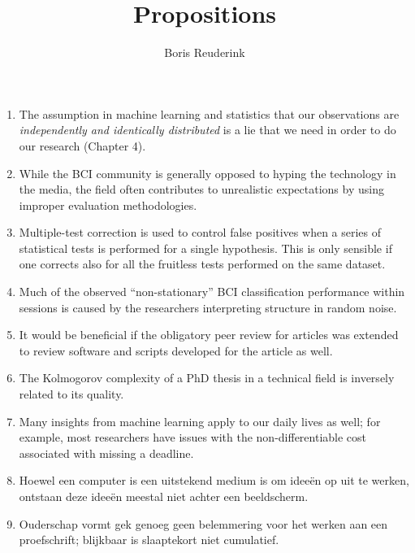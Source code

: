 \documentclass[a5paper]{article}
\title{Propositions}
\author{Boris Reuderink}
\begin{document}
\maketitle
\thispagestyle{empty}

\begin{enumerate}
\item The assumption in machine learning and statistics that our observations
are \emph{independently and identically distributed} is a lie that we need in order to do our research (Chapter 4).

\item While the BCI community is generally opposed to hyping the technology in
the media, the field often contributes to unrealistic expectations by using
improper evaluation methodologies.

\item Multiple-test correction is used to control false positives when a series
of statistical tests is performed for a single hypothesis. This is only
sensible if one corrects also for all the fruitless tests performed on the same
dataset.

\item Much of the observed ``non-stationary'' BCI classification performance
within sessions is caused by the researchers interpreting structure in random
noise.

\item It would be beneficial if the obligatory peer review for articles was
extended to review software and scripts developed for the article as well.

\item The Kolmogorov complexity of a PhD thesis in a technical field is
inversely related to its quality.

\item Many insights from machine learning apply to our daily lives as well; for
example, most researchers have issues with the non-differentiable cost associated with missing a deadline.

\item Hoewel een computer is een uitstekend medium is om ideeën op uit te wer\-ken, ontstaan deze ideeën meestal niet achter een beeldscherm.

\item Ouderschap vormt gek genoeg geen belemmering voor het werken aan een
proefschrift; blijkbaar is slaaptekort niet cumulatief.


\end{enumerate}
\end{document}
